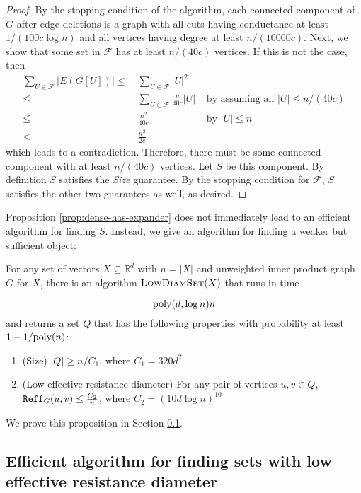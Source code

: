 \begin{proof}
By the stopping condition of the algorithm, each connected component of $G$ after edge deletions is a graph with all cuts having conductance at least $1/(100c \log n)$ and all vertices having degree at least $n/(10000c)$. Next, we show that some set in $\mathcal F$ has at least $n/(40c)$ vertices. If this is not the case, then
\begin{align*}
\sum_{U\in \mathcal F} |E(G[U])|
\le & ~ \sum_{U\in \mathcal F} |U|^2\\
\le & ~ \sum_{U\in \mathcal F} \frac{ n}{40c } |U| & \text{~by~assuming~all~}|U|\leq n / (40c) \\
\le & ~ \frac{ n^2 }{ 40c } & \text{~by~} |U| \leq n \\
< & ~ \frac{n^2} {2c}
\end{align*}
which leads to a contradiction. Therefore, there must be some connected component with at least $n/(40c)$ vertices. Let $S$ be this component. By definition $S$ satisfies the \emph{Size} guarantee. By the stopping condition for $\mathcal F$, $S$ satisfies the other two guarantees as well, as desired.
\end{proof}

Proposition \ref{prop:dense-has-expander} does not immediately lead to an efficient algorithm for finding $S$. Instead, we give an algorithm for finding a weaker but sufficient object:

\begin{proposition}\label{prop:efficient-low-eff-res}
For any set of vectors $X\subseteq \mathbb{R}^d$ with $n = |X|$ and unweighted inner product graph $G$ for $X$, there is an algorithm $\textsc{LowDiamSet}(X)$ that runs in time

$$\mathrm{poly}(d, \log n) n$$
and returns a set $Q$ that has the following properties with probability at least $1 - 1/\mathrm{poly}(n)$:

\begin{enumerate}
    \item (Size) $|Q| \ge n/C_1$, where $C_1 = 320d^2$
    \item (Low effective resistance diameter) For any pair of vertices $u,v\in Q$, $\mathtt{Reff}_G(u,v)\le \frac{C_2}{n}$, where $C_2 = (10d\log n)^{10}$
\end{enumerate}
\end{proposition}

We prove this proposition in Section \ref{subsec:eff-res-diam}.

\subsection{Efficient algorithm for finding sets with low effective resistance diameter} \label{subsec:eff-res-diam}

